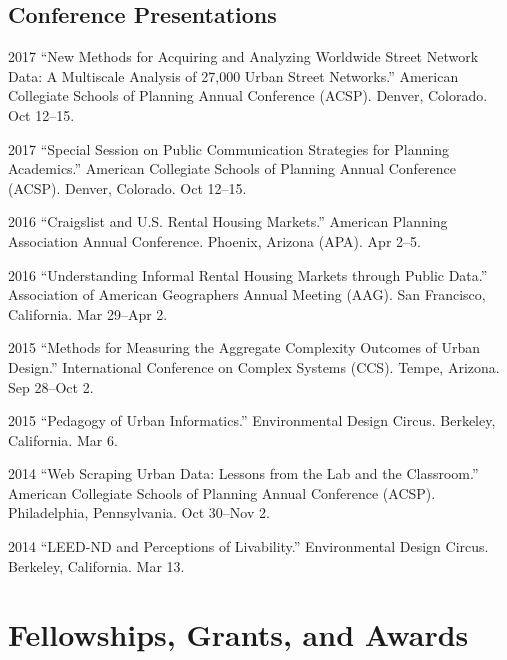 \documentclass{academiccv}
\begin{document}
\subsection*{Conference Presentations}

\begin{tablist}

\item[2017] \tab \enquote{New Methods for Acquiring and Analyzing Worldwide Street Network Data: A Multiscale Analysis of 27,000 Urban Street Networks.} American Collegiate Schools of Planning Annual Conference (ACSP). Denver, Colorado. Oct 12--15.

\item[2017] \tab \enquote{Special Session on Public Communication Strategies for Planning Academics.} American Collegiate Schools of Planning Annual Conference (ACSP). Denver, Colorado. Oct 12--15.

\item[2016] \tab \enquote{Craigslist and U.S. Rental Housing Markets.} American Planning Association Annual Conference. Phoenix, Arizona (APA). Apr 2--5.

\item[2016] \tab \enquote{Understanding Informal Rental Housing Markets through Public Data.} Association of American Geographers Annual Meeting (AAG). San Francisco, California. Mar 29--Apr 2.

\item[2015] \tab \enquote{Methods for Measuring the Aggregate Complexity Outcomes of Urban Design.} International Conference on Complex Systems (CCS). Tempe, Arizona. Sep 28--Oct 2.

\item[2015] \tab \enquote{Pedagogy of Urban Informatics.} Environmental Design Circus. Berkeley, California. Mar 6.

\item[2014] \tab \enquote{Web Scraping Urban Data: Lessons from the Lab and the Classroom.} American Collegiate Schools of Planning Annual Conference (ACSP). Philadelphia, Pennsylvania. Oct 30--Nov 2.

\item[2014] \tab \enquote{LEED-ND and Perceptions of Livability.} Environmental Design Circus. Berkeley, California. Mar 13.

\end{tablist}



\section*{Fellowships, Grants, and Awards}
\end{document}
